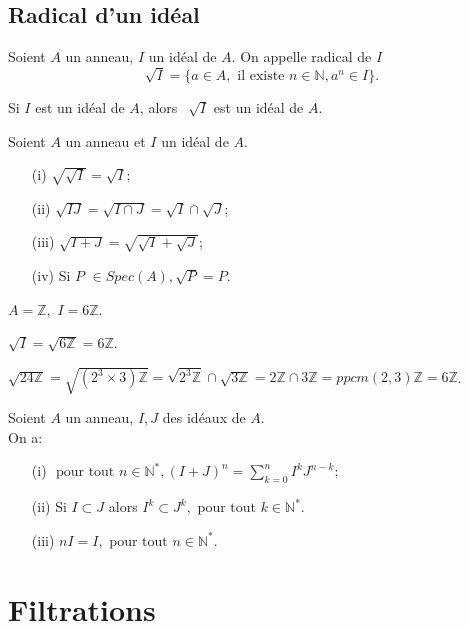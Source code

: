 \subsection{Radical d'un idéal}
\begin{madefinition}
	Soient $A$ un anneau, $I$ un idéal de $A$. On appelle radical de $I$
	\[\sqrt[]{I} = \{ a \in A, \text{ il existe } n \in \mathbb{N}, a^n \in I \}. \]
\end{madefinition}
\begin{maremarque}
	Si $I$ est un idéal de $A$, alors $\, \sqrt[]{I}$ est un idéal de $A$.
\end{maremarque}
\begin{maproposition}
	Soient $A$ un anneau et $I$ un idéal de $A$.
	\begin{enumerate}
		\item[(i)] $\sqrt{\sqrt{I}} = \sqrt{I}$;
		\item[(ii)] $\sqrt{IJ} = \sqrt{I\cap J}=\sqrt{I}\cap \sqrt{J}$;
		\item[(iii)] $\sqrt{I+J} = \sqrt{\sqrt{I}+\sqrt{J}}$;
		\item[(iv)] Si $P$ $\in Spec(A),\sqrt{P}=P$.
	\end{enumerate}
\end{maproposition}
\begin{monexemple}
	$A=\mathbb{Z},$ $I=6\mathbb{Z}$.
	
	$\sqrt{I}=\sqrt{6\mathbb{Z}}=6\mathbb{Z}$.
	
	$\sqrt{24\mathbb{Z}}=\sqrt{(2^{3}\times 3)\mathbb{Z}}=\sqrt{2^{3}\mathbb{Z}}\cap \sqrt{3\mathbb{Z}}=2\mathbb{Z}\cap 3\mathbb{Z}=ppcm(2,3)\mathbb{Z}=6\mathbb{Z}$.
\end{monexemple}
\begin{maproposition}
	Soient $A$ un anneau, $I,J$ des idéaux de $A$. \\
	On a:
	\begin{enumerate}
		\item[(i)] $\text{ pour tout } n \in \mathbb{N}^{*}, (I+J)^n =\displaystyle \sum_{k=0}^{n} I^k J^{n-k};$
		\item[(ii)] Si $I \subset J$ alors $I^k \subset J^k , \text{ pour tout } k \in \mathbb{N}^*.$
		\item [(iii)] $nI=I, \text{ pour tout } n \in \mathbb{N}^*.$
	\end{enumerate}
\end{maproposition}
\section{Filtrations}
